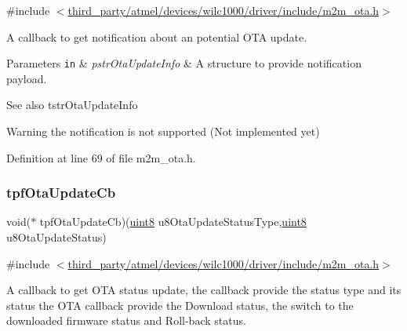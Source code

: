 {\ttfamily \#include $<$\hyperlink{m2m__ota_8h}{third\+\_\+party/atmel/devices/wilc1000/driver/include/m2m\+\_\+ota.\+h}$>$}



A callback to get notification about an potential O\+TA update. 


\begin{DoxyParams}[1]{Parameters}
\mbox{\tt in}  & {\em pstr\+Ota\+Update\+Info} & A structure to provide notification payload.\\
\hline
\end{DoxyParams}
\begin{DoxySeeAlso}{See also}
tstr\+Ota\+Update\+Info 
\end{DoxySeeAlso}
\begin{DoxyWarning}{Warning}
the notification is not supported (Not implemented yet) 
\end{DoxyWarning}


Definition at line 69 of file m2m\+\_\+ota.\+h.

\mbox{\label{group__OTATYPEDEF_ga86bdacc22dca0d0844e0825d81fb4f85}} 
\subsubsection{\texorpdfstring{tpf\+Ota\+Update\+Cb}{tpfOtaUpdateCb}}
{\footnotesize\ttfamily void($\ast$ tpf\+Ota\+Update\+Cb)(\hyperlink{group__DataT_ga4df709a77647e870bbf1d955b8edc9a6}{uint8} u8\+Ota\+Update\+Status\+Type,\hyperlink{group__DataT_ga4df709a77647e870bbf1d955b8edc9a6}{uint8} u8\+Ota\+Update\+Status)}



{\ttfamily \#include $<$\hyperlink{m2m__ota_8h}{third\+\_\+party/atmel/devices/wilc1000/driver/include/m2m\+\_\+ota.\+h}$>$}



A callback to get O\+TA status update, the callback provide the status type and its status the O\+TA callback provide the Download status, the switch to the downloaded firmware status and Roll-\/back status. 


